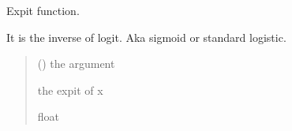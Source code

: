 \documentclass[letterpaper,10pt,english]{sphinxmanual}
\begin{document}

\begin{fulllineitems}
\label{\detokenize{cubmods:cubmods.general.expit}}
\pysigstartsignatures
{}
\pysigstopsignatures
\sphinxAtStartPar
Expit function.

\sphinxAtStartPar
It is the inverse of logit. Aka
sigmoid or standard logistic.
\begin{quote}\begin{description}
\sphinxAtStartPar
{} () \textendash{} the argument

\sphinxAtStartPar
the expit of x

\sphinxAtStartPar
float

\end{description}\end{quote}

\end{fulllineitems}

\end{document}
